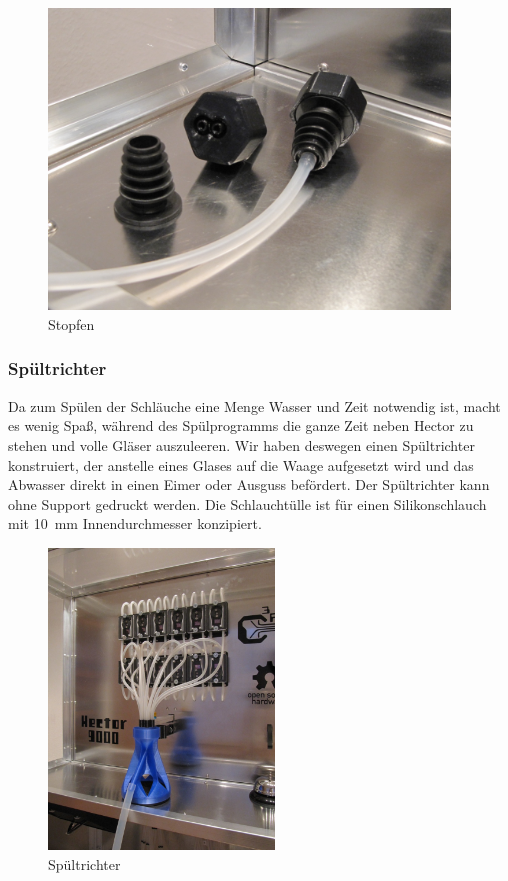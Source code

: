 \documentclass[a4paper]{scrartcl}
\begin{document}
\begin{figure}
  \centering
  \includegraphics[height=8cm]{pics/plugs}
  \caption{Stopfen} \label{plugs}
\end{figure}

\subsubsection{Spültrichter}
Da zum Spülen der Schläuche eine Menge Wasser und Zeit notwendig ist, macht es wenig Spaß, während des Spülprogramms die ganze Zeit neben Hector zu stehen und volle Gläser auszuleeren. Wir haben deswegen einen Spültrichter konstruiert, der anstelle eines Glases auf die Waage aufgesetzt wird und das Abwasser direkt in einen Eimer oder Ausguss befördert. Der Spültrichter kann ohne Support gedruckt werden. Die Schlauchtülle ist für einen Silikonschlauch mit \SI{10}{\milli\metre} Innendurchmesser konzipiert.    
\begin{figure}
  \centering
  \includegraphics[height=8cm]{pics/funnel.JPG}
  \caption{Spültrichter} \label{funnel}
\end{figure}
\end{document}
